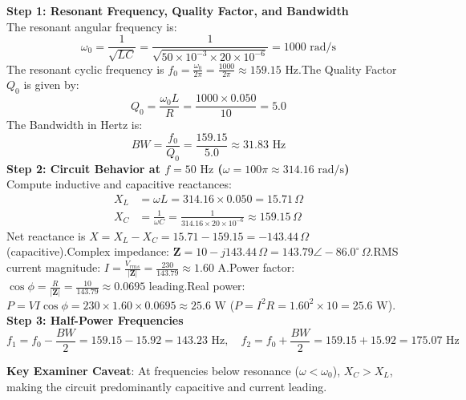 \begin{solbox}
\textbf{Step 1: Resonant Frequency, Quality Factor, and Bandwidth}\\The resonant angular frequency is:\[ \omega_0 = \frac{1}{\sqrt{LC}} = \frac{1}{\sqrt{50 \times 10^{-3} \times 20 \times 10^{-6}}} = 1000\text{ rad/s} \]The resonant cyclic frequency is $f_0 = \frac{\omega_0}{2\pi} = \frac{1000}{2\pi} \approx 159.15\text{ Hz}$.The Quality Factor $Q_0$ is given by:\[ Q_0 = \frac{\omega_0 L}{R} = \frac{1000 \times 0.050}{10} = 5.0 \]The Bandwidth in Hertz is:\[ BW = \frac{f_0}{Q_0} = \frac{159.15}{5.0} \approx 31.83\text{ Hz} \]\textbf{Step 2: Circuit Behavior at $f = 50\text{ Hz}$ ($\omega = 100\pi \approx 314.16\text{ rad/s}$)}\\Compute inductive and capacitive reactances:\begin{align*}X_L &= \omega L = 314.16 \times 0.050 = 15.71\,\Omega \\X_C &= \frac{1}{\omega C} = \frac{1}{314.16 \times 20 \times 10^{-6}} \approx 159.15\,\Omega\end{align*}Net reactance is $X = X_L - X_C = 15.71 - 159.15 = -143.44\,\Omega$ (capacitive).Complex impedance: $\mathbf{Z} = 10 - j143.44\,\Omega = 143.79 \angle -86.0^\circ\,\Omega$.RMS current magnitude: $I = \frac{V_{rms}}{|\mathbf{Z}|} = \frac{230}{143.79} \approx 1.60\text{ A}$.Power factor: $\cos\phi = \frac{R}{|\mathbf{Z}|} = \frac{10}{143.79} \approx 0.0695\text{ leading}$.Real power: $P = V I \cos\phi = 230 \times 1.60 \times 0.0695 \approx 25.6\text{ W}$ ($P = I^2 R = 1.60^2 \times 10 = 25.6\text{ W}$).\\[2mm]\textbf{Step 3: Half-Power Frequencies}\\\[ f_1 = f_0 - \frac{BW}{2} = 159.15 - 15.92 = 143.23\text{ Hz}, \quad f_2 = f_0 + \frac{BW}{2} = 159.15 + 15.92 = 175.07\text{ Hz} \]
\end{solbox}

\begin{examinertip}
\textbf{Key Examiner Caveat}: At frequencies below resonance ($\omega < \omega_0$), $X_C > X_L$, making the circuit predominantly capacitive and current leading.
\end{examinertip}
\vspace{4mm}

